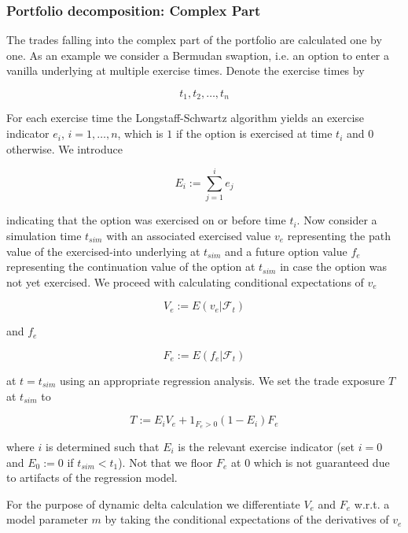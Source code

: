 \subsubsection{Portfolio decomposition: Complex Part}

The trades falling into the complex part of the portfolio are calculated one by one. As an example we consider a
Bermudan swaption, i.e. an option to enter a vanilla underlying at multiple exercise times. Denote the exercise times by

$$
{ t_1, t_2, \ldots, t_n }
$$

For each exercise time the Longstaff-Schwartz algorithm yields an exercise indicator $e_i$, $i=1,\ldots,n$, which is $1$
if the option is exercised at time $t_i$ and $0$ otherwise. We introduce

$$
E_i := \sum_{j=1}^i e_j
$$

indicating that the option was exercised on or before time $t_i$. Now consider a simulation time $t_{sim}$ with an
associated exercised value $v_e$ representing the path value of the exercised-into underlying at $t_{sim}$ and a
future option value $f_e$ representing the continuation value of the option at $t_{sim}$ in case the option was not
yet exercised. We proceed with calculating conditional expectations of $v_e$

\begin{equation}\label{aad:calc1}
V_e := E( v_e | \mathcal{F}_t )
\end{equation}

and $f_e$

\begin{equation}\label{aad:calc2}
F_e := E( f_e | \mathcal{F}_t )
\end{equation}

at $t = t_{sim}$ using an appropriate regression analysis. We set the trade exposure $T$ at $t_{sim}$ to

\begin{equation}\label{aad:calc3}
T := E_i V_e + 1_{F_e > 0} (1 - E_i) F_e
\end{equation}

where $i$ is determined such that $E_i$ is the relevant exercise indicator (set $i=0$ and $E_0 := 0$ if $t_{sim} <
t_1$). Not that we floor $F_e$ at $0$ which is not guaranteed due to artifacts of the regression model.

For the purpose of dynamic delta calculation we differentiate $V_e$ and $F_e$ w.r.t. a model parameter $m$
by taking the conditional expectations of the derivatives of $v_e$

